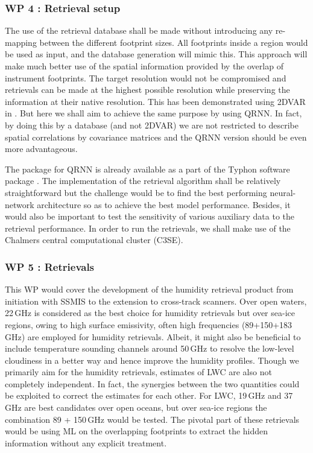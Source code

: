 \documentclass[12pt,oneside,a4paper]{article}
\begin{document}
\subsubsection*{WP 4 : Retrieval setup}
%
\label{sec:setup}
The use of the retrieval database shall be made without introducing any re-mapping between the different footprint sizes. All footprints inside a region would be used as input, and the database generation will mimic this. This approach will make much better use of the spatial information provided by the overlap of instrument footprints. The target resolution would not be compromised and retrievals can be made at the highest possible resolution while preserving the information at their native resolution. This has been demonstrated using 2DVAR in \citep{duncan:onthe:19}. But here we shall aim to achieve the same purpose by using QRNN. In fact, by doing this by a database (and not 2DVAR) we are not restricted to describe spatial correlations by covariance matrices and the QRNN version should be even more advantageous.

The package for QRNN is already available as a part of the Typhon software package \citep{lemke:2020:typhon}. The implementation of the retrieval algorithm shall be relatively straightforward but the challenge would be to find the best performing neural-network architecture so as to achieve the best model performance. Besides, it would also be important to test the sensitivity of various auxiliary data to the retrieval performance. In order to run the retrievals, we shall make use of the Chalmers central computational cluster (C3SE).


\subsubsection*{WP 5 : Retrievals}
%
\label{sec:retrievals}
%
This WP would cover the development of the humidity retrieval product from initiation with SSMIS to the extension to cross-track scanners. Over open waters, 22\,GHz is considered as the best choice for humidity retrievals but over sea-ice regions, owing to high surface emissivity, often high frequencies (89+150+183\,GHz) are employed for humidity retrievals. Albeit, it might also be beneficial to include temperature sounding channels around 50\,GHz to resolve the low-level cloudiness in a better way and hence improve the humidity profiles. Though we primarily aim for the humidity retrievals, estimates of LWC are also not completely independent. In fact, the synergies between the two quantities could be exploited to correct the estimates for each other. For LWC, 19\,GHz and 37\,GHz are best candidates over open oceans, but over sea-ice regions the combination 89 + 150\,GHz would be tested. The pivotal part of these retrievals would be using ML on the overlapping footprints to extract the hidden information without any explicit treatment. 
\end{document}
